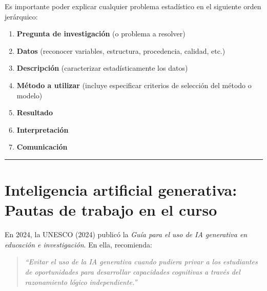 \documentclass[
  spanish,
  letterpaper,
  DIV=11,
  numbers=noendperiod]{scrreprt}
\providecommand{\tightlist}{%
  \setlength{\itemsep}{0pt}\setlength{\parskip}{0pt}}
\begin{document}
\begin{tcolorbox}[enhanced jigsaw, arc=.35mm, bottomrule=.15mm, bottomtitle=1mm, breakable, colback=white, colbacktitle=quarto-callout-tip-color!10!white, colframe=quarto-callout-tip-color-frame, coltitle=black, left=2mm, leftrule=.75mm, opacityback=0, opacitybacktitle=0.6, rightrule=.15mm, title=\textcolor{quarto-callout-tip-color}{\faLightbulb}\hspace{0.5em}{Jerarquía para explicar un problema estadístico}, titlerule=0mm, toprule=.15mm, toptitle=1mm]

Es importante poder explicar cualquier problema estadístico en el
siguiente orden jerárquico:

\begin{enumerate}
\def\labelenumi{\arabic{enumi}.}
\tightlist
\item
  \textbf{Pregunta de investigación} (o problema a resolver)
\item
  \textbf{Datos} (reconocer variables, estructura, procedencia, calidad,
  etc.)
\item
  \textbf{Descripción} (caracterizar estadísticamente los datos)
\item
  \textbf{Método a utilizar} (incluye especificar criterios de selección
  del método o modelo)
\item
  \textbf{Resultado}
\item
  \textbf{Interpretación}
\item
  \textbf{Comunicación}
\end{enumerate}

\end{tcolorbox}

\begin{center}\rule{0.5\linewidth}{0.5pt}\end{center}

\section{Inteligencia artificial generativa: Pautas de trabajo en el
curso}\label{inteligencia-artificial-generativa-pautas-de-trabajo-en-el-curso}

En 2024, la UNESCO (2024) publicó la \emph{Guía para el uso de IA
generativa en educación e investigación}. En ella, recomienda:

\begin{tcolorbox}[enhanced jigsaw, arc=.35mm, bottomrule=.15mm, bottomtitle=1mm, breakable, colback=white, colbacktitle=quarto-callout-note-color!10!white, colframe=quarto-callout-note-color-frame, coltitle=black, left=2mm, leftrule=.75mm, opacityback=0, opacitybacktitle=0.6, rightrule=.15mm, title=\textcolor{quarto-callout-note-color}{\faInfo}\hspace{0.5em}{Recomendación UNESCO (2024)}, titlerule=0mm, toprule=.15mm, toptitle=1mm]

\begin{quote}
\emph{``Evitar el uso de la IA generativa cuando pudiera privar a los
estudiantes de oportunidades para desarrollar capacidades cognitivas a
través del razonamiento lógico independiente.''}
\end{quote}

\end{tcolorbox}
\end{document}
